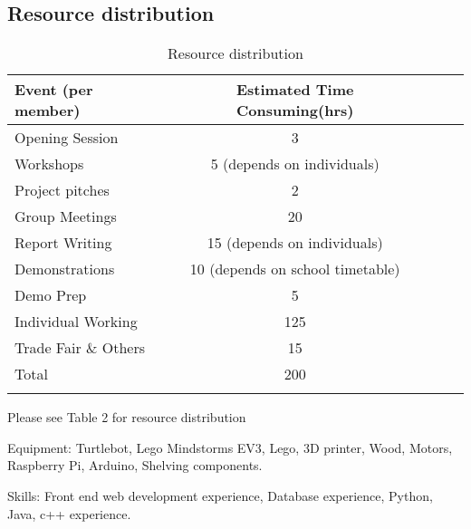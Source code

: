 \documentclass{article}
\begin{document}


\subsection{Resource distribution}
\begin{table*}[h]
\vskip 3mm
\begin{center}
\begin{small}
\begin{sc}
\begin{tabular}{lcccr}
\hline
\abovespace\belowspace
Event (per member) & Estimated Time Consuming(hrs) \\ \hline
\hline
\abovespace
Opening Session & 3 \\ \hline
Workshops & 5 (depends on individuals) \\ \hline
Project pitches & 2 \\ \hline
Group Meetings & 20  \\ \hline
Report Writing & 15 (depends on individuals) \\ \hline
Demonstrations & 10 (depends on school timetable) \\ \hline
Demo Prep & 5 \\ \hline
Individual Working  & 125 \\ \hline
Trade Fair \& Others & 15 \\ \hline
Total & 200 \\ \hline
\belowspace
\end{tabular}
\end{sc}
\end{small}
\caption{Resource distribution}
\label{tab:sample-table}
\end{center}
\vskip -3mm
\end{table*}

Please see Table 2 for resource distribution

Equipment: Turtlebot, Lego Mindstorms EV3, Lego, 3D printer, Wood, Motors, Raspberry Pi, Arduino, Shelving components. 

Skills: Front end web development experience, Database experience, Python, Java, c++ experience. 
\end{document}

